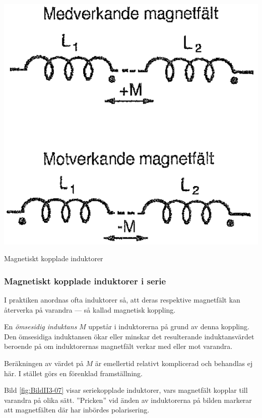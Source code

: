 \begin{marginfigure}%
  \includegraphics[width=1\textwidth]{images/cropped_pdfs/bild_2_3-07.pdf}
  \caption{Magnetiskt kopplade induktorer}
  \label{fig:BildII3-07}
\end{marginfigure}

\subsubsection{Magnetiskt kopplade induktorer i serie}

I praktiken anordnas ofta induktorer så, att deras respektive magnetfält kan
återverka på varandra --- så kallad magnetisk koppling.

En \emph{ömsesidig induktans} \(M\) uppstår i induktorerna på grund av denna
koppling.
Den ömsesidiga induktansen ökar eller minskar det resulterande induktansvärdet
beroende på om induktorernas magnetfält verkar med eller mot varandra.

Beräkningen av värdet på \(M\) är emellertid relativt komplicerad och behandlas
ej här.
I stället görs en förenklad framställning.

Bild \ref{fig:BildII3-07} visar seriekopplade induktorer, vars magnetfält
kopplar till varandra på olika sätt.
''Pricken'' vid änden av induktorerna på bilden markerar att magnetfälten där
har inbördes polarisering.

